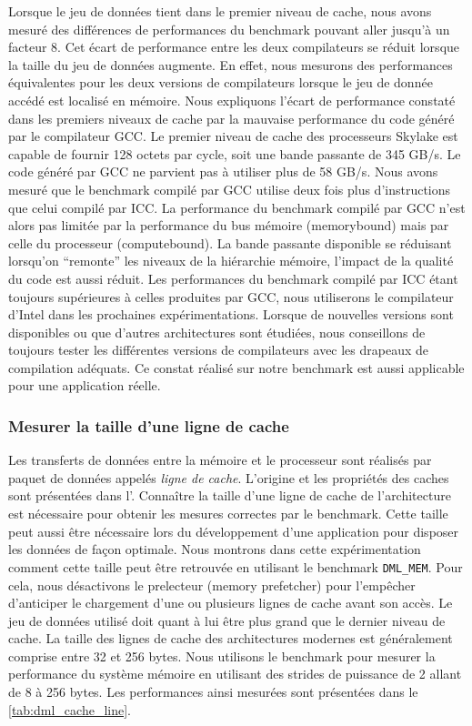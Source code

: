         Lorsque le jeu de données tient dans le premier niveau de cache, nous avons mesuré des différences de performances du benchmark pouvant aller jusqu'à un facteur 8. Cet écart de performance entre les deux compilateurs se réduit lorsque la taille du jeu de données augmente. En effet, nous mesurons des performances équivalentes pour les deux versions de compilateurs lorsque le jeu de donnée accédé est localisé en mémoire. Nous expliquons l'écart de performance constaté dans les premiers niveaux de cache par la mauvaise performance du code généré par le compilateur GCC. Le premier niveau de cache des processeurs Skylake est capable de fournir 128 octets par cycle, soit une bande passante de 345 GB/s. Le code généré par GCC ne parvient pas à utiliser plus de 58 GB/s. Nous avons mesuré que le benchmark compilé par GCC utilise deux fois plus d'instructions que celui compilé par ICC. La performance du benchmark compilé par GCC n'est alors pas limitée par la performance du bus mémoire (\gls{memorybound}) mais par celle du processeur (\gls{computebound}). La bande passante disponible se réduisant lorsqu'on ``remonte'' les niveaux de la hiérarchie mémoire, l'impact de la qualité du code est aussi réduit. Les performances du benchmark compilé par ICC étant toujours supérieures à celles produites par GCC, nous utiliserons le compilateur d'Intel dans les prochaines expérimentations. Lorsque de nouvelles versions sont disponibles ou que d'autres architectures sont étudiées, nous conseillons de toujours tester les différentes versions de compilateurs avec les drapeaux de compilation adéquats. Ce constat réalisé sur notre benchmark est aussi applicable pour une application réelle.
    
    
    \subsubsection{Mesurer la taille d'une ligne de cache}
    
        Les transferts de données entre la mémoire et le processeur sont réalisés par paquet de données appelés \textit{ligne de cache}. L'origine et les propriétés des caches sont présentées dans l'. Connaître la taille d'une ligne de cache de l'architecture est nécessaire pour obtenir les mesures correctes par le benchmark. Cette taille peut aussi être nécessaire lors du développement d'une application pour disposer les données de façon optimale. Nous montrons dans cette expérimentation comment cette taille peut être retrouvée en utilisant le benchmark \verb=DML_MEM=. Pour cela, nous désactivons le \gls{prelecteur} (memory prefetcher) pour l'empêcher d'anticiper le chargement d'une ou plusieurs lignes de cache avant son accès. Le jeu de données utilisé doit quant à lui être plus grand que le dernier niveau de cache. La taille des lignes de cache des architectures modernes est généralement comprise entre 32 et 256 bytes. Nous utilisons le benchmark pour mesurer la performance du système mémoire en utilisant des \glspl{stride} de puissance de 2 allant de 8 à 256 bytes. Les performances ainsi mesurées sont présentées dans le \autoref{tab:dml_cache_line}.
    
